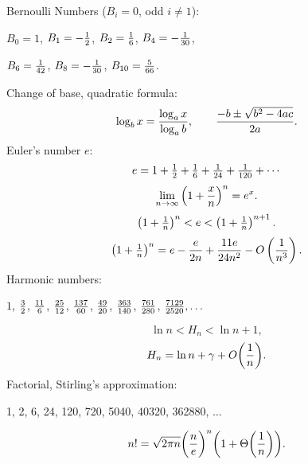 Bernoulli Numbers ($B_i = 0$, odd $i \neq 1$):
\vskip 3pt
\centerline{
$B_0 = 1$,
$B_1 = -{ 1 \over 2}$,
$B_2 = { 1 \over 6}$,
$B_4 = -{ 1 \over 30 }$,}
\vskip 2pt
\centerline{
$B_6 = { 1 \over 42}$,
$B_8 = -{ 1 \over 30}$,
$B_{10} = { 5 \over 66}$. }
\vskip 3pt
Change of base, quadratic formula:
$$\log_b x = {\log_a x \over \log_a b}, \qquad
{-b \pm \sqrt{b^2 - 4ac} \over 2a}.$$
Euler's number $e$:
$$e = 1 + \sfrac 1 2 + \sfrac 1 6 + \sfrac 1 24 + \sfrac 1 120 + \cdots$$
$$\lim_{n \to \infty} \Big(1 + {x \over n}\Big)^n = e^x.$$
$$\left(1 + \sfrac 1 n \right)^n < e < \left(1 + \sfrac 1 n \right)^{n+1}.$$
$$\left(1 + \sfrac 1 n \right)^n =  e - {e \over 2 n} + {11 e \over 24 n^2} - O\left({1 \over n^3}\right). $$
Harmonic numbers:
\vskip 3pt
\centerline{
$1$,
${3 \over 2}$,
${11 \over 6}$,
${25 \over 12}$,
${137 \over 60}$,
${49 \over 20}$,
${363 \over 140}$,
${761 \over 280}$,
${7129 \over 2520}, \ldots$
}
\vskip 3pt
$$ \ln n < H_n < \ln n + 1,$$
$$ H_n =  \ln n + \gamma + O\bigg({1 \over n} \bigg).$$
Factorial, Stirling's approximation:
\vskip 3pt
{\sevenrm
\centerline{
1, 2, 6, 24, 120, 720, 5040, 40320, 362880, $\ldots$}}
$$ n! = \sqrt{2\pi n} \bigg({n \over e}\bigg)^n\bigg(1 + \Theta\bigg({1\over n}\bigg)\bigg).$$
